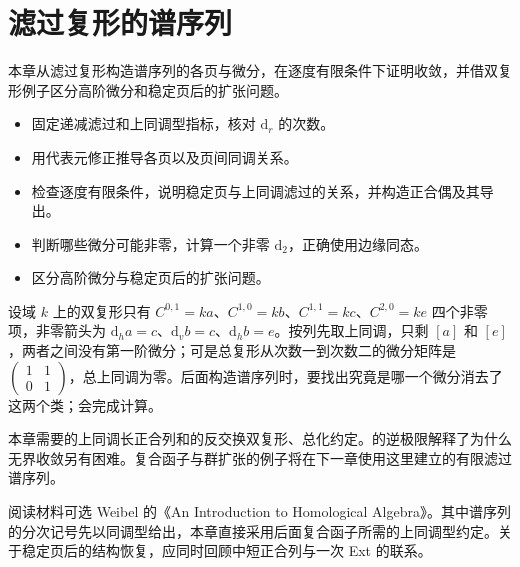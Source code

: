 
\chapter{滤过复形的谱序列}
\label{b4:ch:14}

\begin{chapterabstract}
	本章从滤过复形构造谱序列的各页与微分，在逐度有限条件下证明收敛，并借双复形例子区分高阶微分和稳定页后的扩张问题。
\end{chapterabstract}

\begin{learninggoals}
	\begin{itemize}
		\item 固定递减滤过和上同调型指标，核对 \(\mathrm{d}_r\) 的次数。
		\item 用代表元修正推导各页以及页间同调关系。
		\item 检查逐度有限条件，说明稳定页与上同调滤过的关系，并构造正合偶及其导出。
		\item 判断哪些微分可能非零，计算一个非零 \(\mathrm{d}_2\)，正确使用边缘同态。
		\item 区分高阶微分与稳定页后的扩张问题。
	\end{itemize}
\end{learninggoals}

设域 \(k\) 上的双复形只有 \(C^{0,1}=ka\)、\(C^{1,0}=kb\)、\(C^{1,1}=kc\)、\(C^{2,0}=ke\) 四个非零项，非零箭头为 \(\mathrm{d}_ha=c\)、\(\mathrm{d}_vb=c\)、\(\mathrm{d}_hb=e\)。按列先取上同调，只剩 \([a]\) 和 \([e]\)，两者之间没有第一阶微分；可是总复形从次数一到次数二的微分矩阵是 \(\left(\begin{smallmatrix}1&1\\0&1\end{smallmatrix}\right)\)，总上同调为零。后面构造谱序列时，要找出究竟是哪一个微分消去了这两个类；会完成计算。

\ProseParagraphBreak
本章需要的上同调长正合列和的反交换双复形、总化约定。的逆极限解释了为什么无界收敛另有困难。复合函子与群扩张的例子将在下一章使用这里建立的有限滤过谱序列。

\ProseParagraphBreak
阅读材料可选 Weibel 的《An Introduction to Homological Algebra》\cite[Sections 5.2--5.5, Section 5.9]{Weibel1994HomologicalAlgebra}。其中谱序列的分次记号先以同调型给出，本章直接采用后面复合函子所需的上同调型约定。关于稳定页后的结构恢复，应同时回顾中短正合列与一次 Ext 的联系。

